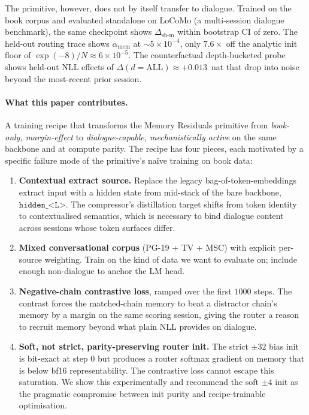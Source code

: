 \documentclass{article}
\newcommand{\dsh}{\Delta_{\text{sh-m}}}
\newcommand{\amem}{\alpha_{\text{mem}}}
\begin{document}
The primitive, however, does not by itself transfer to dialogue.
Trained on the book corpus and evaluated standalone on LoCoMo
(a multi-session dialogue benchmark), the same checkpoint shows
$\dsh$ within bootstrap CI of zero. The held-out routing trace shows
$\amem$ at $\sim 5\!\times\!10^{-4}$, only $7.6\times$ off the
analytic init floor of $\exp(-8)/N \approx 6\!\times\!10^{-5}$. The
counterfactual depth-bucketed probe shows held-out NLL effects of
$\Delta(d{=}\mathrm{ALL}) \approx +0.013$~nat that drop into noise
beyond the most-recent prior session.

\paragraph{What this paper contributes.} A training recipe that
transforms the Memory Residuals primitive from \emph{book-only,
margin-effect} to \emph{dialogue-capable, mechanistically active}
on the same backbone and at compute parity. The recipe has four
pieces, each motivated by a specific failure mode of the
primitive's na\"ive training on book data:

\begin{enumerate}\setlength{\itemsep}{0pt}
\item \textbf{Contextual extract source.} Replace the legacy
bag-of-token-embeddings extract input with a hidden state from
mid-stack of the bare backbone, $\texttt{hidden\_<L>}$. The
compressor's distillation target shifts from token identity to
contextualised semantics, which is necessary to bind dialogue
content across sessions whose token surfaces differ.
\item \textbf{Mixed conversational corpus} (PG-19 + TV + MSC) with
explicit per-source weighting. Train on the kind of data we want
to evaluate on; include enough non-dialogue to anchor the LM head.
\item \textbf{Negative-chain contrastive loss}, ramped over the
first $1000$ steps. The contrast forces the matched-chain memory
to beat a distractor chain's memory by a margin on the same
scoring session, giving the router a reason to recruit memory
beyond what plain NLL provides on dialogue.
\item \textbf{Soft, not strict, parity-preserving router init.}
The strict $\pm 32$ bias init is bit-exact at step $0$ but produces
a router softmax gradient on memory that is below bf16
representability. The contrastive loss cannot escape this
saturation. We show this experimentally and recommend the soft
$\pm 4$ init as the pragmatic compromise between init purity and
recipe-trainable optimisation.
\end{enumerate}
\end{document}
